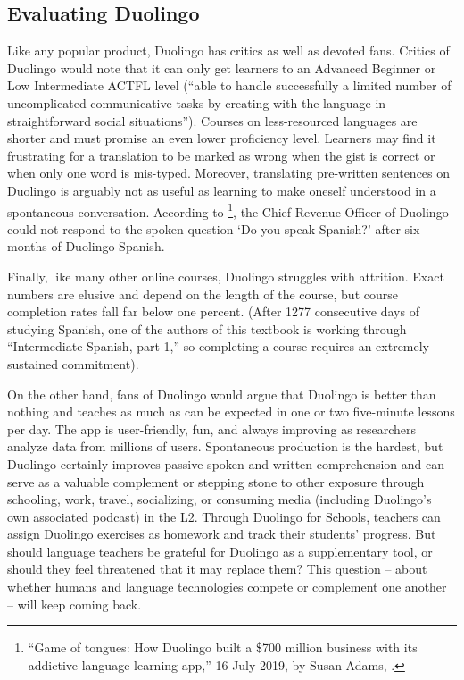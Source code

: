




\subsection{Evaluating Duolingo}

Like any popular product, Duolingo has critics as well as devoted fans.  Critics of Duolingo would note that it can only get learners to an Advanced Beginner or Low Intermediate ACTFL level (``able to handle
successfully a limited number of uncomplicated communicative tasks by
creating with the language in straightforward social situations'').
Courses on less-resourced languages are shorter and must promise an
even lower proficiency level.  Learners may find it frustrating for a
translation to be marked as wrong when the gist is correct or when
only one word is mis-typed.  Moreover, translating pre-written
sentences on Duolingo is arguably not as useful as learning to make
oneself understood in a spontaneous conversation.  According to \footnote{``Game of tongues: How
Duolingo built a \$700 million business with its addictive
language-learning app,'' 16 July 2019, by Susan Adams, .}, the Chief Revenue Officer of
Duolingo could not respond to the spoken question
 `Do you speak Spanish?' after
six months of Duolingo Spanish.

Finally, like many other online courses, Duolingo struggles with
attrition.  Exact numbers are elusive and depend on the length of the
course, but course completion rates fall far below one percent.  (After 1277
consecutive days of studying Spanish, one of the authors of this
textbook is working through ``Intermediate Spanish, part 1,'' so
completing a course requires an extremely sustained commitment).

On the other hand, fans of Duolingo would argue that Duolingo is
better than nothing and teaches as much as can be expected in one or
two five-minute lessons per day.  The app is user-friendly, fun, and
always improving as researchers analyze data from millions of users.
Spontaneous production is the hardest, but Duolingo certainly improves
passive spoken and written comprehension and can serve as a valuable
complement or stepping stone to other exposure through schooling,
work, travel, socializing, or consuming media (including Duolingo's
own associated podcast) in the L2.  Through Duolingo for Schools,
teachers can assign Duolingo exercises as homework and track their
students' progress.  But should language teachers be grateful for
Duolingo as a supplementary tool, or should they feel threatened that
it may replace them?  This question -- about whether humans and
language technologies compete or complement one another -- will keep
coming back.

